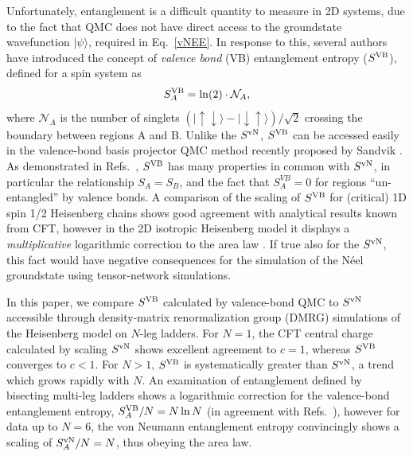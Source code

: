 \documentclass[prl,aps,twocolumn,floatfix,amsmath,amssymb,superscriptaddress,tightenlines]{revtex4}
\begin{document}
Unfortunately, entanglement is a difficult quantity to
measure in 2D systems, due to the fact that QMC 
does not have
direct access to the groundstate wavefunction $| \psi \rangle$, required
in Eq.~\eqref{vNEE}.  In response to this, several authors \cite{Alet,
Chh} have introduced the concept of {\it valence bond} (VB)
entanglement entropy ($S^{\rm VB}$), defined for a  spin system as
\begin{equation} 
S^{\rm VB}_A = \ln(2) \cdot \mathcal{N}_A, \label{VBEE}
\end{equation} 
where $ \mathcal{N}_A$ is the number of singlets
${( |\uparrow \downarrow \rangle - | \downarrow \uparrow
\rangle)/\sqrt{2}}$ crossing the boundary between regions A and B.  Unlike
the $S^{ \rm vN}$, $S^{\rm VB}$ can be accessed easily in the valence-bond basis
projector QMC method recently proposed by Sandvik \cite{Sandvik}.  As
demonstrated in Refs.~\cite{Alet,Chh}, $S^{\rm VB}$ has many properties in
common with $S^{ \rm vN}$, in particular the relationship $S_A = S_B$, and the
fact that $S^{VB}_A=0$ for regions ``un-entangled'' by valence bonds.
A comparison of the scaling of $S^{\rm VB}$ for (critical) 1D spin
1/2 Heisenberg chains shows good agreement with analytical results known
from CFT, however in the
 2D isotropic Heisenberg model it
displays a {\it multiplicative} logarithmic correction to the area law \cite{Alet,Chh}.  If
true also for the $S^{ \rm vN}$, this fact would have negative consequences for the simulation of the 
N\'eel groundstate using tensor-network simulations.

 
In this paper, we compare $S^{\rm VB}$ calculated by valence-bond QMC to 
$S^{ \rm vN}$ accessible through density-matrix renormalization group
(DMRG) simulations of the Heisenberg model on $N$-leg ladders.    For $N=1$, the CFT central charge calculated  by scaling
$S^{ \rm vN}$ shows excellent agreement to $c=1$, whereas $S^{\rm VB}$ converges
to $c<1$.
For $N>1$, $S^{\rm VB}$ is systematically greater than $S^{ \rm vN}$,
a trend which grows rapidly with $N$. An
examination of entanglement defined by bisecting multi-leg ladders
shows a logarithmic correction for the valence-bond entanglement entropy, $S^{\rm VB}_A /N = N \ln
N$ (in agreement with Refs.~\cite{Alet,Chh}), however for data up to
$N=6$, the von Neumann entanglement entropy  convincingly shows a scaling of
$S^{\rm vN}_A /N = N$, thus obeying the area law.
\end{document}
